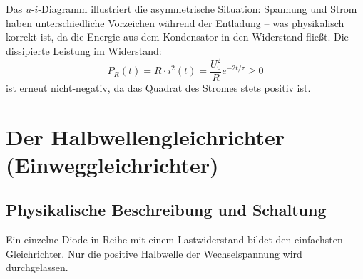 ﻿\documentclass[12pt, a4paper]{article}
\begin{document}
	Das $u$-$i$-Diagramm illustriert die asymmetrische Situation: Spannung und Strom haben unterschiedliche Vorzeichen während der Entladung -- was physikalisch korrekt ist, da die Energie aus dem Kondensator in den Widerstand fließt. Die dissipierte Leistung im Widerstand:
	\begin{equation}
		P_R(t) = R \cdot i^2(t) = \frac{U_0^2}{R} e^{-2t/\tau} \geq 0
	\end{equation}
	ist erneut nicht-negativ, da das Quadrat des Stromes stets positiv ist.
	
	\section{Der Halbwellengleichrichter (Einweggleichrichter)}
	
	\subsection{Physikalische Beschreibung und Schaltung}
	
	Ein einzelne Diode in Reihe mit einem Lastwiderstand bildet den einfachsten Gleichrichter. Nur die positive Halbwelle der Wechselspannung wird durchgelassen.
	
\end{document}
